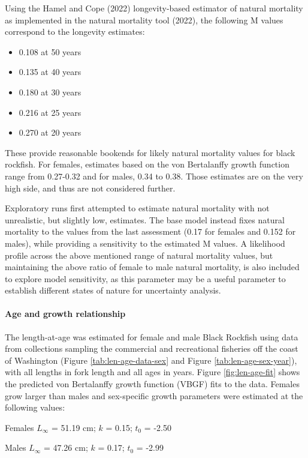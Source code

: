 \documentclass[11pt,
  english,
  letterpaper,
]{article}
\providecommand{\tightlist}{%
  \setlength{\itemsep}{0pt}\setlength{\parskip}{0pt}}
\providecommand{\tightlist}{%
  \setlength{\itemsep}{0pt}\setlength{\parskip}{0pt}}
\begin{document}
Using the Hamel and Cope (2022) longevity-based estimator of natural mortality as implemented in the natural mortality tool (2022), the following M values correspond to the longevity estimates:

\begin{itemize}
\tightlist
\item
  0.108 at 50 years
\item
  0.135 at 40 years
\item
  0.180 at 30 years
\item
  0.216 at 25 years
\item
  0.270 at 20 years
\end{itemize}

These provide reasonable bookends for likely natural mortality values for black rockfish. For females, estimates based on the von Bertalanffy growth function range from 0.27-0.32 and for males, 0.34 to 0.38. Those estimates are on the very high side, and thus are not considered further.

Exploratory runs first attempted to estimate natural mortality with not unrealistic, but slightly low, estimates. The base model instead fixes natural mortality to the values from the last assessment (0.17 for females and 0.152 for males), while providing a sensitivity to the estimated M values. A likelihood profile across the above mentioned range of natural mortality values, but maintaining the above ratio of female to male natural mortality, is also included to explore model sensitivity, as this parameter may be a useful parameter to establish different states of nature for uncertainty analysis.

\hypertarget{age-and-growth-relationship}{%
\paragraph{Age and growth relationship}\label{age-and-growth-relationship}}

The length-at-age was estimated for female and male Black Rockfish using data from collections sampling the commercial and recreational fisheries off the coast of Washington (Figure \ref{tab:len-age-data-sex} and Figure \ref{tab:len-age-sex-year}), with all lengths in fork length and all ages in years. Figure \ref{fig:len-age-fit} shows the predicted von Bertalanffy growth function (VBGF) fits to the data. Females grow larger than males and sex-specific growth parameters were estimated at the following values:

\begin{centering}

Females $L_{\infty}$ = 51.19 cm; $k$ = 0.15; $t_0$ = -2.50

Males $L_{\infty}$ = 47.26 cm; $k$ = 0.17; $t_0$ = -2.99

\end{centering}
\end{document}

